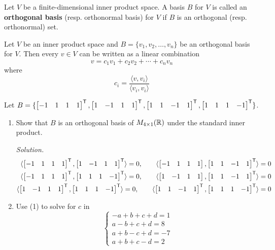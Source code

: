 \begin{definition}
Let $V$ be a finite-dimensional inner product space. A basis $B$ for $V$ is called an \textbf{orthogonal basis} (resp. orthonormal basis) for $V$ if $B$ is an orthogonal (resp. orthonormal) set.
\end{definition}

\begin{theorem}
Let $V$ be an inner product space and $B = \{v_1, v_2, \dots, v_n\}$ be an orthogonal basis for $V$. Then every $v \in V$ can be written as a linear combination
$$v = c_1v_1 + c_2v_2 + \cdots + c_nv_n$$
where 
$$c_i = \frac{\langle v, v_i\rangle}{\langle v_i, v_i \rangle}$$
\end{theorem}

\begin{example}
Let $B = \{\begin{bmatrix} -1 & 1 & 1 & 1 \end{bmatrix}^{\mathsf{T}}, \begin{bmatrix} 1 & -1 & 1 & 1 \end{bmatrix}^{\mathsf{T}}, \begin{bmatrix} 1 &1 & -1 & 1 \end{bmatrix}^{\mathsf{T}}, \begin{bmatrix} 1 & 1 & 1 & -1 \end{bmatrix}^{\mathsf{T}}\}$.

\begin{enumerate}
    \item Show that $B$ is an orthogonal basis of $M_{4 \times 1}(\mathbb{R})$ under the standard inner product.

    \textit{Solution.}
    \begin{align*}
    \langle \begin{bmatrix} -1 & 1 & 1 & 1 \end{bmatrix}^{\mathsf{T}}, \begin{bmatrix} 1 & -1 & 1 & 1 \end{bmatrix}^{\mathsf{T}} \rangle = 0, \quad \quad \langle\begin{bmatrix} -1 & 1 & 1 & 1 \end{bmatrix}, \begin{bmatrix} 1 & 1 & -1 & 1 \end{bmatrix}^{\mathsf{T}}\rangle = 0 \\
    \langle\begin{bmatrix} -1 & 1 & 1 & 1 \end{bmatrix}^{\mathsf{T}}, \begin{bmatrix} 1 & 1 & 1 & -1 \end{bmatrix}^{\mathsf{T}}\rangle = 0, \quad \quad \langle\begin{bmatrix} 1 & -1 & 1 & 1 \end{bmatrix}, \begin{bmatrix} 1 & 1 & -1 & 1 \end{bmatrix}^{\mathsf{T}}\rangle = 0 \\
    \langle\begin{bmatrix} 1 & -1 & 1 & 1 \end{bmatrix}^{\mathsf{T}}, \begin{bmatrix} 1 & 1 & 1 & -1 \end{bmatrix}^{\mathsf{T}}\rangle = 0, \quad \quad \langle\begin{bmatrix} 1 & 1 & -1 & 1 \end{bmatrix}^{\mathsf{T}}, \begin{bmatrix} 1 & 1 & 1 & -1 \end{bmatrix}^{\mathsf{T}}\rangle = 0
    \end{align*}
    
    \item Use (1) to solve for $c$ in
    $$\begin{cases}
        -a + b + c + d = 1\\
        a - b + c + d = 8 \\
        a + b - c + d = -7 \\
        a + b + c - d = 2
    \end{cases}$$


\end{enumerate}
\end{example}
